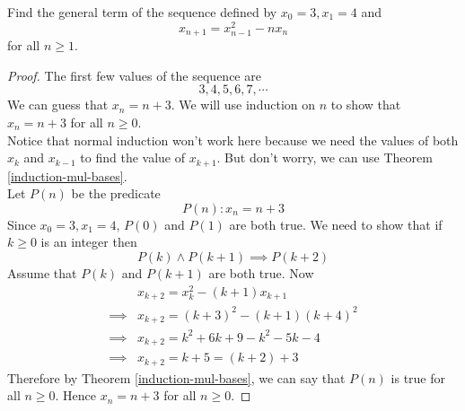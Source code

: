 \documentclass[11pt,numbers=noenddot,svgnames,dvipsnames]{scrartcl}
\begin{document}
\begin{example}
    Find the general term of the sequence defined by $x_{0}=3, x_{1}=4$ and 
    \[
        x_{n+1} = x_{n-1}^{2} - n x_{n}
    \]
    for all $n\geq 1$.
\end{example}
\begin{proof}
    The first few values of the sequence are 
    \[
        3, 4, 5, 6, 7, \cdots
    \]
    We can guess that $x_{n} = n + 3$. We will use induction on $n$ to show that 
    $x_{n} = n + 3$ for all $n \geq 0$. \\
    Notice that normal induction won't work here because we need the values of both $x_{k}$ and $x_{k-1}$ 
    to find the value of $x_{k + 1}$. But don't worry, we can use Theorem \ref{induction-mul-bases}. \\
    Let $P(n)$ be the predicate 
    \[
        P(n): x_{n} = n + 3
    \]
    Since $x_{0} = 3, x_{1} = 4$, $P(0)$ and $P(1)$ are both true. We need to show that if $k\geq 0$ 
    is an integer then 
    \[
        P(k) \wedge P(k + 1) \implies P(k + 2)
    \]
    Assume that $P(k)$ and $P(k + 1)$ are both true. Now
    \begin{align*}
                 & x_{k + 2} = x_{k}^{2} - (k + 1)x_{k + 1} \\
        \implies & x_{k + 2} = (k + 3)^{2} - (k + 1)(k + 4)^{2} \\
        \implies & x_{k + 2} = k^{2} + 6k + 9 - k^{2} - 5k - 4 \\
        \implies & x_{k + 2} = k + 5 = (k + 2) + 3
    \end{align*}
    Therefore by Theorem \ref{induction-mul-bases}, we can say that $P(n)$ is true for all $n \geq 0$. 
    Hence $x_{n} = n + 3$ for all $n \geq 0$.
\end{proof}
\end{document}
